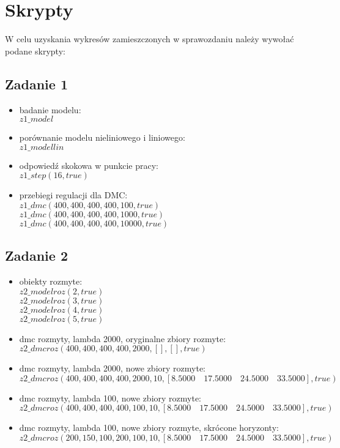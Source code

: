 \chapter{Skrypty}
	\label{ch:skrypty}
	W celu uzyskania wykresów zamieszczonych w sprawozdaniu należy wywołać podane skrypty:
	\section{Zadanie 1}
	\begin{itemize}
		\item badanie modelu:\\
		$z1\_model$
		\item porównanie modelu nieliniowego i liniowego:\\
		$z1\_modellin$
		\item odpowiedź skokowa w punkcie pracy:\\
		$z1\_step(16, true)$
		\item przebiegi regulacji dla DMC:\\
		$z1\_dmc(400, 400, 400, 400, 100, true)$\\
		$z1\_dmc(400, 400, 400, 400, 1000, true)$\\
		$z1\_dmc(400, 400, 400, 400, 10000, true)$\\	
	\end{itemize}
	\section{Zadanie 2}
	\begin{itemize}
		\item obiekty rozmyte:\\
		$z2\_modelroz(2, true)$\\
		$z2\_modelroz(3, true)$\\
		$z2\_modelroz(4, true)$\\
		$z2\_modelroz(5, true)$\\
		\item dmc rozmyty, lambda 2000, oryginalne zbiory rozmyte:\\
		$z2\_dmcroz(400, 400, 400, 400, 2000,[],[], true)$
		\item dmc rozmyty, lambda 2000, nowe zbiory rozmyte:\\
		$z2\_dmcroz(400, 400, 400, 400, 2000,10,[8.5000\quad17.5000\quad   24.5000\quad   33.5000], true)$
		\item dmc rozmyty, lambda 100, nowe zbiory rozmyte:\\
		$z2\_dmcroz(400, 400, 400, 400, 100,10,[8.5000\quad17.5000\quad   24.5000\quad   33.5000], true)$
		\item dmc rozmyty, lambda 100, nowe zbiory rozmyte, skrócone horyzonty:\\
		$z2\_dmcroz(200, 150, 100, 200, 100,10,[8.5000\quad17.5000\quad   24.5000\quad   33.5000], true)$
	\end{itemize}
